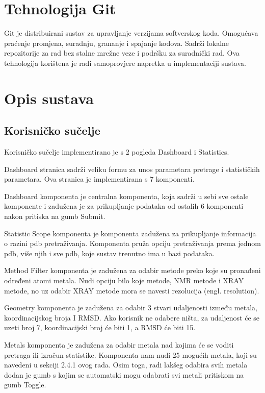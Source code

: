 \documentclass[times, utf8, zavrsni]{fer}
\begin{document}
\section{Tehnologija Git}
Git je distribuirani sustav za upravljanje verzijama softverskog koda. Omogućava praćenje promjena, suradnju, grananje i spajanje kodova. Sadrži lokalne repozitorije za rad bez stalne mrežne veze i podršku za suradnički rad. Ova tehnologija korištena je  radi samoprovjere napretka u implementaciji sustava. 
\cite{git}

\section{Opis sustava}
 \subsection{Korisničko sučelje}

Korisničko sučelje implementirano je s 2 pogleda Dashboard i Statistics.

Dashboard stranica sadrži veliku formu za unos parametara pretrage i statističkih parametara. Ova stranica je implementirana s 7 komponenti.

Dashboard komponenta je centralna komponenta, koja sadrži u sebi sve ostale komponente i zadužena je za prikupljanje podataka od ostalih 6 komponenti
nakon pritiska na gumb Submit.

Statistic Scope komponenta je komponenta zadužena za prikupljanje informacija o razini pdb pretraživanja. Komponenta pruža opciju pretraživanja prema jednom pdb,
više njih i sve pdb, koje sustav trenutno ima u bazi podataka.

Method Filter komponenta je zadužena za odabir metode preko koje su pronađeni određeni atomi metala. Nudi opciju bilo koje metode, NMR metode i XRAY metode, no
uz odabir XRAY metode mora se navesti rezolucija (engl. resolution).

Geometry komponenta je zadužena za odabir 3 stvari udaljenosti između metala, koordinacijskog broja I RMSD. Ako korisnik ne odabere ništa, za udaljenost će se uzeti
broj 7, koordinacijski broj će biti 1, a RMSD će biti 15.

Metals komponenta je zadužena za odabir metala nad kojima će se voditi pretraga ili izračun statistike. Komponenta nam nudi 25 mogućih metala, koji su navedeni u sekciji 
2.4.1 ovog rada. Osim toga, radi lakšeg odabira svih metala dodan je gumb s kojim se automatski mogu odabrati svi metali  pritiskom na gumb  Toggle.
\end{document}

